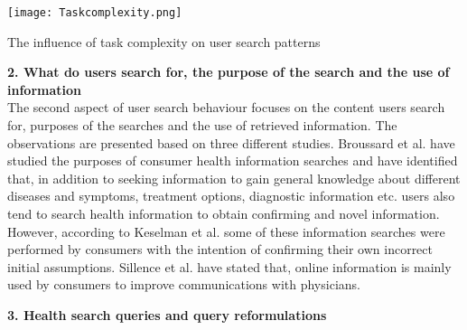 \documentclass[]{article}
\begin{document}
\begin{table}[b!]
	
	\texttt{[image: Taskcomplexity.png]}
	\caption{The influence of task complexity on user search patterns\label{tabel1}}
	
\end{table} 

\vspace{0.25cm}

\textbf{2. What do users search for, the purpose of the search and the use of information}
\\

The second aspect of user search behaviour focuses on the content users search for, purposes of the searches and the use of retrieved information. The observations are presented based on three different studies. Broussard et al. \cite{broussard2013seeking} have studied the purposes of consumer health information searches and have identified that, in addition to seeking information to gain general knowledge about different diseases and symptoms, treatment options, diagnostic information etc. users also tend to search health information to obtain confirming and novel information. However, according to Keselman et al. \cite{keselman2008consumer} some of these information searches were performed by consumers with the intention of confirming their own incorrect initial assumptions. Sillence et al. \cite{sillence2007patients} have stated that, online information is mainly used by consumers to improve communications with physicians. 

\vspace{0.25cm}

\textbf{3. Health search queries and query reformulations}\\
\end{document}
